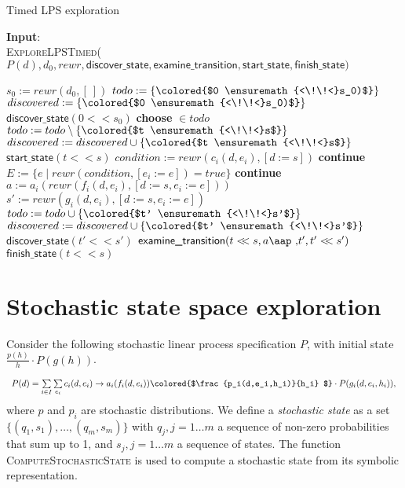 \documentclass{article}
\newcommand{\at}[1]{\mbox{\aap ,} #1}
\newcommand{\aftertime}{\ensuremath{<\!\!<}}
\begin{document}
\begin{algorithm}
\small
\caption{Timed LPS exploration}
\vspace*{1ex}
{\textbf{Input}:} \\
\textsc{ExploreLPSTimed}($P(d), d_0, rewr, \textsf{discover\_state}, \textsf{examine\_transition}, \textsf{start\_state}, \textsf{finish\_state})$
\begin{algorithmic}[1]
\State $s_0 := rewr(d_0, [\:])$
\State $todo := \{\colored{$0 \aftertime s_0)$}\}$
\State $discovered := \{ \colored{$0 \aftertime s_0)$} \}$
\State $\textsf{discover\_state}(0 \aftertime s_0)$
  \State \textbf{choose} \colored{$t \aftertime s$} $\in todo$
  \State $todo := todo \setminus \{ \colored{$t \aftertime s$} \}$
  \State $discovered := discovered \cup \{ \colored{$t \aftertime s$} \}$
  \State $\textsf{start\_state}(t \aftertime s)$
    \State $condition := rewr(c_i(d, e_i), [d := s])$
      \State \textbf{continue}
    \EndIf
    \State $E := \{ e \mid rewr(condition, [e_i := e]) = true \}$
      \State {}
        \State \textbf{continue}
      \EndIf    
      \State $a := a_i(rewr(f_i(d,e_i), [d:=s,e_i:=e]))$
      \State $s' := rewr(g_i(d,e_i), [d:=s,e_i:=e])$
      \If {$\colored{$t' \aftertime s'$} \notin discovered$}
        \State $todo := todo \cup \{ \colored{$t' \aftertime s'$} \}$
        \State $discovered := discovered \cup \{ \colored{$t' \aftertime s'$} \}$
        \State $\textsf{discover\_state}( t' \aftertime s' )$
      \EndIf
      \State $\textsf{examine\_transition}(t \aftertime s, a \at t', t' \aftertime s')$
    \EndFor
  \EndFor
  \State $\textsf{finish\_state}(t \aftertime s)$
\EndWhile
\end{algorithmic}
\end{algorithm}

\newpage
\section{Stochastic state space exploration}
Consider the following stochastic linear process specification $P$, with initial
state $\frac{p(h)}{h} \cdot P(g(h))$.

\begin{equation}
\begin{array}{l}
P(d)=
\sum\limits_{i\in I}\sum\limits_{e_i}c_i(d, e_i)\rightarrow a_i(f_i(d,e_i))
\colored{$\frac{p_i(d,e_i,h_i)}{h_i} $}
\cdot P(g_i(d,e_i,h_i)),
\end{array}
\end{equation}
where $p$ and $p_i$ are stochastic distributions.
We define a \emph{stochastic state} as a set
$\{(q_1, s_1), \ldots, (q_m, s_m)\}$ with $q_j, j = 1 \ldots m$ a sequence of non-zero probabilities that sum up to 1, and $s_j, j = 1 \ldots m$ a sequence of states.
The function \textsc{ComputeStochasticState} is used to compute a stochastic state from its symbolic representation.
\end{document}
